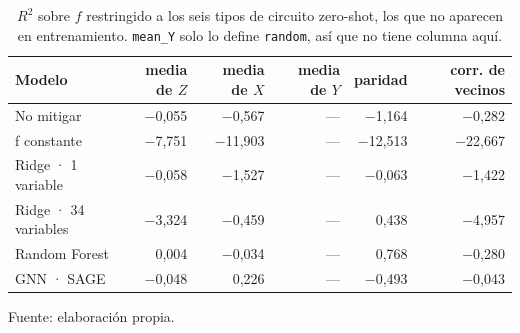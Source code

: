 \begin{table}[htbp]
    \centering
    {\footnotesize
    \begin{tabular}{@{}lrrrrr@{}}
        \toprule
        \textbf{Modelo} & \textbf{media de $Z$} & \textbf{media de $X$} & \textbf{media de $Y$} & \textbf{paridad} & \textbf{corr. de vecinos} \\
        \midrule
        No mitigar & $-$0,055 & $-$0,567 & --- & $-$1,164 & $-$0,282 \\
        f constante & $-$7,751 & $-$11,903 & --- & $-$12,513 & $-$22,667 \\
        Ridge · 1 variable & $-$0,058 & $-$1,527 & --- & $-$0,063 & $-$1,422 \\
        Ridge · 34 variables & $-$3,324 & $-$0,459 & --- & 0,438 & $-$4,957 \\
        Random Forest & 0,004 & $-$0,034 & --- & 0,768 & $-$0,280 \\
        GNN · SAGE & $-$0,048 & 0,226 & --- & $-$0,493 & $-$0,043 \\
        \bottomrule
    \end{tabular}}

    \caption{$R^2$ sobre $f$ restringido a los seis tipos de circuito zero-shot, los que no aparecen en entrenamiento. \texttt{mean\_Y} solo lo define \texttt{random}, así que no tiene columna aquí.}
    \label{tab:comparativa_zeroshot}

    {\footnotesize Fuente: elaboración propia.}
\end{table}
